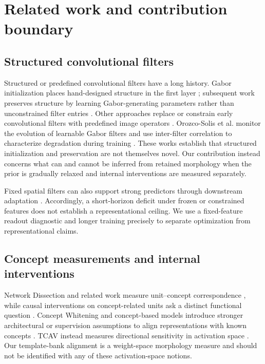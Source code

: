 \documentclass[10pt]{article}
\begin{document}
\section{Related work and contribution boundary}\label{sec:related}

\subsection{Structured convolutional filters}

Structured or predefined convolutional filters have a long history. Gabor initialization places hand-designed structure in the first layer \citep{ozbulak_2018_gabor-initialization}; subsequent work preserves structure by learning Gabor-generating parameters rather than unconstrained filter entries \citep{molaei_2020_gabor-filter-structure,wang_2024_learnable-gabor}. Other approaches replace or constrain early convolutional filters with predefined image operators \citep{ma_2020_predefined-filters,linse_2024_predefined-filters}. Orozco-Solis et al. monitor the evolution of learnable Gabor filters and use inter-filter correlation to characterize degradation during training \citep{orozco-solis_2024_learnable-gabor-filters}. These works establish that structured initialization and preservation are not themselves novel. Our contribution instead concerns what can and cannot be inferred from retained morphology when the prior is gradually relaxed and internal interventions are measured separately.

Fixed spatial filters can also support strong predictors through downstream adaptation \citep{gaudio_2023_fixed-filters,gavrikov_2023_random-convolutions}. Accordingly, a short-horizon deficit under frozen or constrained features does not establish a representational ceiling. We use a fixed-feature readout diagnostic and longer training precisely to separate optimization from representational claims.

\subsection{Concept measurements and internal interventions}

Network Dissection and related work measure unit--concept correspondence \citep{bau_2017_network-dissection}, while causal interventions on concept-related units ask a distinct functional question \citep{bau_2020_causal-units}. Concept Whitening and concept-based models introduce stronger architectural or supervision assumptions to align representations with known concepts \citep{chen_2020_concept-whitening,koh_2020_concept-bottlenecks,zarlenga_2022_concept-embeddings}. TCAV instead measures directional sensitivity in activation space \citep{kim_2018_tcav}. Our template-bank alignment is a weight-space morphology measure and should not be identified with any of these activation-space notions.
\end{document}
